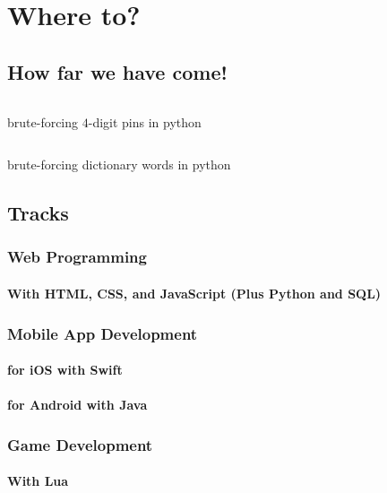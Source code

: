 \chapter{Where to?}
\section{How far we have come!}
\begin{code}
	\inputminted{python}{codes/src8/pin.py}
	\caption{brute-forcing $4$-digit pins in python}
\end{code}
\begin{code}
	\inputminted{python}{codes/src8/password.py}
	\caption{brute-forcing dictionary words in python}
\end{code}

\section{Tracks}
\subsection{Web Programming}
\subsubsection{With HTML, CSS, and JavaScript (Plus Python and SQL)}

\subsection{Mobile App Development}
\subsubsection{for iOS with Swift}
\subsubsection{for Android with Java}

\subsection{Game Development}
\subsubsection{With Lua}
